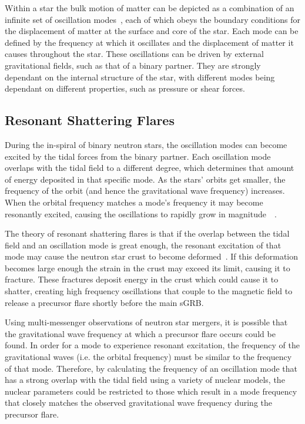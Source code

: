 \documentclass[fleqn,usenatbib]{mnras}
\begin{document}
\hspace{\parindent}Within a star the bulk motion of matter can be depicted as a combination of an infinite set of oscillation modes~\cite{smeyers2011linear}, each of which obeys the boundary conditions for the displacement of matter at the surface and core of the star. Each mode can be defined by the frequency at which it oscillates and the displacement of matter it causes throughout the star. These oscillations can be driven by external gravitational fields, such as that of a binary partner. They are strongly dependant on the internal structure of the star, with different modes being dependant on different properties, such as pressure or shear forces.







\subsection{Resonant Shattering Flares}
\hspace{\parindent}During the in-spiral of binary neutron stars, the oscillation modes can become excited by the tidal forces from the binary partner. Each oscillation mode overlaps with the tidal field to a different degree, which determines that amount of energy deposited in that specific mode. As the stars' orbits get smaller, the frequency of the orbit (and hence the gravitational wave frequency) increases. When the orbital frequency matches a mode's frequency it may become resonantly excited, causing the oscillations to rapidly grow in magnitude~\cite{tsang2012resonant}~\cite{tsang2013shattering}.

\hspace{\parindent}The theory of resonant shattering flares is that if the overlap between the tidal field and an oscillation mode is great enough, the resonant excitation of that mode may cause the neutron star crust to become deformed~\cite{troja2010precursors}. If this deformation becomes large enough the strain in the crust may exceed its limit, causing it to fracture. These fractures deposit energy in the crust which could cause it to shatter, creating high frequency oscillations that couple to the magnetic field to release a precursor flare shortly before the main sGRB.%

\hspace{\parindent}Using multi-messenger observations of neutron star mergers, it is possible that the gravitational wave frequency at which a precursor flare occurs could be found. In order for a mode to experience resonant excitation, the frequency of the gravitational waves (i.e. the orbital frequency) must be similar to the frequency of that mode. Therefore, by calculating the frequency of an oscillation mode that has a strong overlap with the tidal field using a variety of nuclear models, the nuclear parameters could be restricted to those which result in a mode frequency that closely matches the observed gravitational wave frequency during the precursor flare. 
\end{document}
